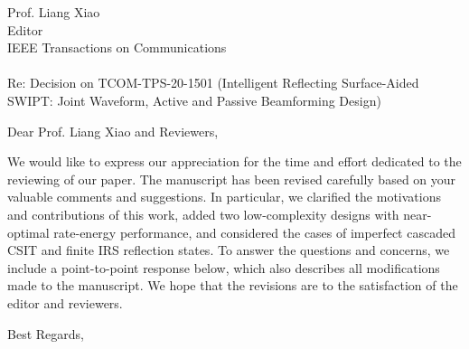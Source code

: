 \documentclass[a4paper, 10pt]{letter}
\date{}
\begin{document}
	\begin{letter}{Prof. Liang Xiao \\ Editor \\ IEEE Transactions on Communications \\ ~ \\ Re: Decision on TCOM-TPS-20-1501 (Intelligent Reflecting Surface-Aided SWIPT: Joint Waveform, Active and Passive Beamforming Design)}
		\opening{Dear Prof. Liang Xiao and Reviewers,}

		We would like to express our appreciation for the time and effort dedicated to the reviewing of our paper. The manuscript has been revised carefully based on your valuable comments and suggestions. In particular, we clarified the motivations and contributions of this work, added two low-complexity designs with near-optimal rate-energy performance, and considered the cases of imperfect cascaded CSIT and finite IRS reflection states. To answer the questions and concerns, we include a point-to-point response below, which also describes all modifications made to the manuscript. We hope that the revisions are to the satisfaction of the editor and reviewers.

		\closing{Best Regards,}
	\end{letter}
\end{document}
